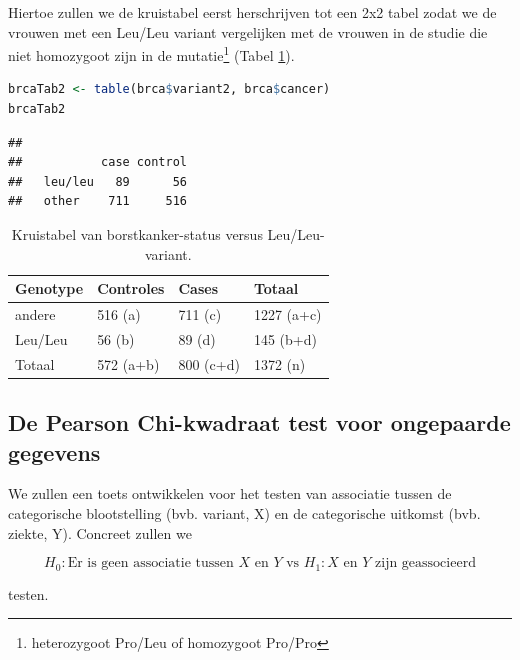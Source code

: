 \documentclass[
  12pt,dutch,coursenotes]{book}
\begin{document}
Hiertoe zullen we de kruistabel eerst herschrijven tot een 2x2 tabel zodat we de vrouwen met een Leu/Leu variant vergelijken met de vrouwen in de studie die niet homozygoot zijn in de mutatie\footnote{heterozygoot Pro/Leu of homozygoot Pro/Pro} (Tabel \ref{tab:leu4}).

\begin{lstlisting}[language=R]
brcaTab2 <- table(brca$variant2, brca$cancer)
brcaTab2
\end{lstlisting}

\begin{lstlisting}
##          
##           case control
##   leu/leu   89      56
##   other    711     516
\end{lstlisting}

\begin{table}

\caption{\label{tab:leu4}Kruistabel van borstkanker-status versus Leu/Leu-variant.}
\centering
\begin{tabular}[t]{llll}
\toprule
Genotype & Controles & Cases & Totaal\\
\midrule
andere & 516 (a) & 711 (c) & 1227 (a+c)\\
Leu/Leu & 56 (b) & 89 (d) & 145 (b+d)\\
Totaal & 572 (a+b) & 800 (c+d) & 1372 (n)\\
\bottomrule
\end{tabular}
\end{table}

\hypertarget{de-pearson-chi-kwadraat-test-voor-ongepaarde-gegevens}{%
\subsection{De Pearson Chi-kwadraat test voor ongepaarde gegevens}\label{de-pearson-chi-kwadraat-test-voor-ongepaarde-gegevens}}

We zullen een toets ontwikkelen voor het testen van associatie tussen de categorische blootstelling (bvb. variant, X) en de categorische uitkomst (bvb. ziekte, Y).
Concreet zullen we

\[H_0: \text{Er is geen associatie tussen } X \text{ en } Y \text{ vs } H_1: X \text{ en } Y \text{ zijn geassocieerd}\]

testen.
\end{document}
